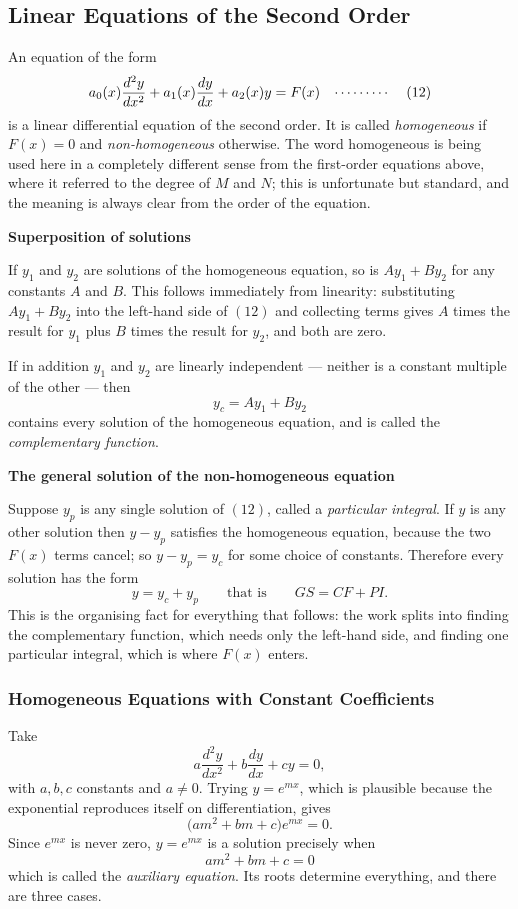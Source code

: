 \documentclass[11pt,a4paper]{article}
\theoremstyle{definition}
\newcommand{\subhead}[1]{%
  \par\medskip\noindent\textbf{#1}\par\nobreak\smallskip}
\begin{document}
\subsection{Linear Equations of the Second Order}

An equation of the form
$$a_0(x)\frac{d^2y}{dx^2} + a_1(x)\frac{dy}{dx} + a_2(x)y = F(x)
\hspace{0.3cm}\cdots\cdots\cdots\hspace{0.4cm} (12)$$
is a linear differential equation of the second order. It is called
\emph{homogeneous} if $F(x) = 0$ and \emph{non-homogeneous} otherwise. The word
homogeneous is being used here in a completely different sense from the
first-order equations above, where it referred to the degree of $M$ and $N$;
this is unfortunate but standard, and the meaning is always clear from the
order of the equation.

\subhead{Superposition of solutions}
If $y_1$ and $y_2$ are solutions of the homogeneous equation, so is
$Ay_1 + By_2$ for any constants $A$ and $B$. This follows immediately from
linearity: substituting $Ay_1 + By_2$ into the left-hand side of $(12)$ and
collecting terms gives $A$ times the result for $y_1$ plus $B$ times the result
for $y_2$, and both are zero.

If in addition $y_1$ and $y_2$ are linearly independent --- neither is a
constant multiple of the other --- then
$$y_c = Ay_1 + By_2$$
contains every solution of the homogeneous equation, and is called the
\emph{complementary function}.

\subhead{The general solution of the non-homogeneous equation}
Suppose $y_p$ is any single solution of $(12)$, called a \emph{particular
integral}. If $y$ is any other solution then $y - y_p$ satisfies the homogeneous
equation, because the two $F(x)$ terms cancel; so $y - y_p = y_c$ for some choice
of constants. Therefore every solution has the form
$$\boxed{y = y_c + y_p}\qquad\text{that is}\qquad GS = CF + PI .$$
This is the organising fact for everything that follows: the work splits into
finding the complementary function, which needs only the left-hand side, and
finding one particular integral, which is where $F(x)$ enters.

\subsubsection{Homogeneous Equations with Constant Coefficients}

Take
$$a\frac{d^2y}{dx^2} + b\frac{dy}{dx} + cy = 0 ,$$
with $a, b, c$ constants and $a\neq 0$. Trying $y = e^{mx}$, which is plausible
because the exponential reproduces itself on differentiation, gives
$$\big(am^2 + bm + c\big)e^{mx} = 0 .$$
Since $e^{mx}$ is never zero, $y = e^{mx}$ is a solution precisely when
$$\boxed{am^2 + bm + c = 0}$$
which is called the \emph{auxiliary equation}. Its roots determine everything,
and there are three cases.
\end{document}
